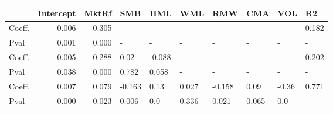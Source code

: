 \begin{tabular}{lrrlllllll}
\toprule
{} &  Intercept &  MktRf &    SMB &    HML &    WML &    RMW &    CMA &   VOL &     R2 \\
\midrule
Coeff.  &      0.006 &  0.305 &      - &      - &      - &      - &      - &     - &  0.182 \\
Pval    &      0.001 &  0.000 &      - &      - &      - &      - &      - &     - &      - \\
Coeff.  &      0.005 &  0.288 &   0.02 & -0.088 &      - &      - &      - &     - &  0.202 \\
Pval    &      0.038 &  0.000 &  0.782 &  0.058 &      - &      - &      - &     - &      - \\
Coeff.  &      0.007 &  0.079 & -0.163 &   0.13 &  0.027 & -0.158 &   0.09 & -0.36 &  0.771 \\
Pval    &      0.000 &  0.023 &  0.006 &    0.0 &  0.336 &  0.021 &  0.065 &   0.0 &      - \\
\bottomrule
\end{tabular}

